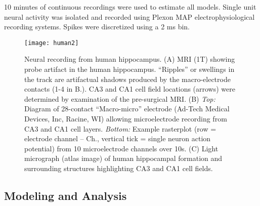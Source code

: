 \documentclass[11pt,a4paper,final]{article}
\begin{document}
10 minutes of continuous recordings were used to estimate all models.
Single unit neural activity was isolated and recorded using Plexon MAP electrophysiological recording systems.
Spikes were discretized using a 2 ms bin.

\begin{figure}[!ht]
	\centering
	\texttt{[image: human2]}
	\caption[Human Electrophysiology]{Neural recording from human hippocampus.
		(A) MRI (1T) showing probe artifact in the human hippocampus.  “Ripples” or swellings in the track are artifactual shadows produced by the macro-electrode contacts (1-4 in B.).  CA3 and CA1 cell field locations (arrows) were determined by examination of the pre-surgical MRI.
		(B) \textit{Top:} Diagram of 28-contact “Macro-micro” electrode (Ad-Tech Medical Devices, Inc, Racine, WI) allowing microelectrode recording from CA3 and CA1 cell layers.
		\textit{Bottom:} Example rasterplot (row = electrode channel – Ch., vertical tick = single neuron action potential) from 10 microelectrode channels over 10s.
		(C) Light micrograph (atlas image) of human hippocampal formation and surrounding structures highlighting CA3 and CA1 cell fields.
	}
	\label{human}
\end{figure}


\subsection{Modeling and Analysis}
\end{document}
